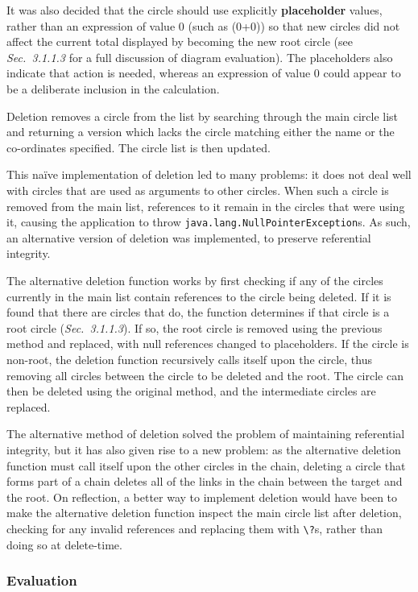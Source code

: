 \documentclass[12pt,twoside,notitlepage,xetex]{report}
\begin{document}
It was also decided that the circle should use explicitly {\bf placeholder} values, rather than an expression of value 0 (such as (0+0)) so that new circles did not affect the current total displayed by becoming the new root circle (see \emph{Sec.~3.1.1.3} for a full discussion of diagram evaluation).  The placeholders also indicate that action is needed, whereas an expression of value 0 could appear to be a deliberate inclusion in the calculation.

Deletion removes a circle from the list by searching through the main circle list and returning a version which lacks the circle matching either the name or the co-ordinates specified.  The circle list is then updated.

This naïve implementation of deletion led to many problems: it does not deal well with circles that are used as arguments to other circles.  When such a circle is removed from the main list, references to it remain in the circles that were using it, causing the application to throw \verb¬java.lang.NullPointerException¬s.  As such, an alternative version of deletion was implemented, to preserve referential integrity.

The alternative deletion function works by first checking if any of the circles currently in the main list contain references to the circle being deleted.  If it is found that there are circles that do, the function determines if that circle is a root circle (\emph{Sec.~3.1.1.3}).  If so, the root circle is removed using the previous method and replaced, with null references changed to placeholders.  If the circle is non-root, the deletion function recursively calls itself upon the circle, thus removing all circles between the circle to be deleted and the root.  The circle can then be deleted using the original method, and the intermediate circles are replaced.

The alternative method of deletion solved the problem of maintaining referential integrity, but it has also given rise to a new problem: as the alternative deletion function must call itself upon the other circles in the chain, deleting a circle that forms part of a chain deletes all of the links in the chain between the target and the root.  On reflection, a better way to implement deletion would have been to make the alternative deletion function inspect the main circle list after deletion, checking for any invalid references and replacing them with \verb¬\?¬s, rather than doing so at delete-time.

\subsubsection{Evaluation}
\end{document}
